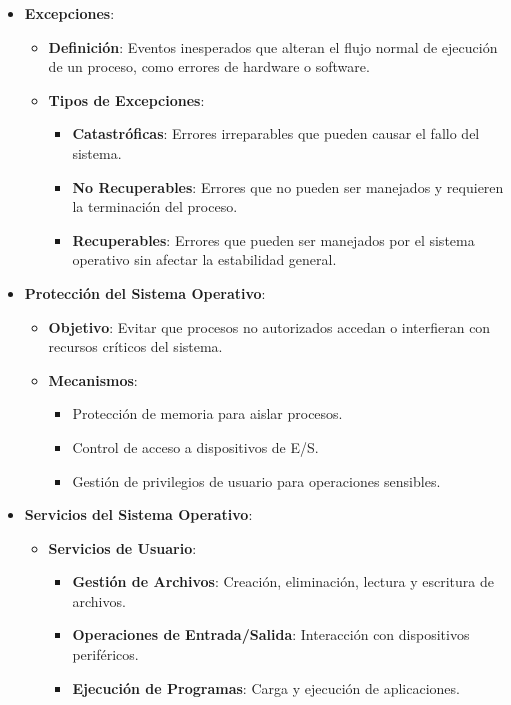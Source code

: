 \begin{itemize}
	\item \textbf{Excepciones}:
	\begin{itemize}
		\item \textbf{Definición}: Eventos inesperados que alteran el flujo normal de ejecución de un proceso, como errores de hardware o software.
		\item \textbf{Tipos de Excepciones}:
		\begin{itemize}
			\item \textbf{Catastróficas}: Errores irreparables que pueden causar el fallo del sistema.
			\item \textbf{No Recuperables}: Errores que no pueden ser manejados y requieren la terminación del proceso.
			\item \textbf{Recuperables}: Errores que pueden ser manejados por el sistema operativo sin afectar la estabilidad general.
		\end{itemize}
	\end{itemize}
	
	\item \textbf{Protección del Sistema Operativo}:
	\begin{itemize}
		\item \textbf{Objetivo}: Evitar que procesos no autorizados accedan o interfieran con recursos críticos del sistema.
		\item \textbf{Mecanismos}:
		\begin{itemize}
			\item Protección de memoria para aislar procesos.
			\item Control de acceso a dispositivos de E/S.
			\item Gestión de privilegios de usuario para operaciones sensibles.
		\end{itemize}
	\end{itemize}
	
	\item \textbf{Servicios del Sistema Operativo}:
	\begin{itemize}
		\item \textbf{Servicios de Usuario}:
		\begin{itemize}
			\item \textbf{Gestión de Archivos}: Creación, eliminación, lectura y escritura de archivos.
			\item \textbf{Operaciones de Entrada/Salida}: Interacción con dispositivos periféricos.
			\item \textbf{Ejecución de Programas}: Carga y ejecución de aplicaciones.
		\end{itemize}
		

\end{itemize}
\end{itemize}
